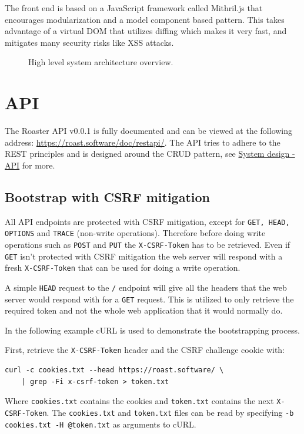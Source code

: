 \documentclass[12pt,a4paper]{report}
\begin{document}
The front end is based on a JavaScript framework called Mithril.js that encourages modularization and a model component based pattern. This takes advantage of a virtual DOM that utilizes diffing which makes it very fast, and mitigates many security risks like XSS attacks. 
\begin{figure}[H]
  \centering
  
  \caption{High level system architecture overview.}
\end{figure}
\chapter{API}
The Roaster API v0.0.1 is fully documented and can be viewed at the following address: \url{https://roast.software/doc/restapi/}. The API tries to adhere to the REST principles and is designed around the CRUD pattern, see \hyperref[sec:api-design]{System design - API} for more.

\section{Bootstrap with CSRF mitigation}
\label{sec:api-bootstrap}
All API endpoints are protected with CSRF mitigation, except for \texttt{GET, HEAD, OPTIONS} and \texttt{TRACE} (non-write operations). Therefore before doing write operations such as \texttt{POST} and \texttt{PUT} the \texttt{X-CSRF-Token} has to be retrieved. Even if \texttt{GET} isn't protected with CSRF mitigation the web server will respond with a fresh \texttt{X-CSRF-Token} that can be used for doing a write operation.

A simple \texttt{HEAD} request to the \texttt{/} endpoint will give all the headers that the web server would respond with for a \texttt{GET} request. This is utilized to only retrieve the required token and not the whole web application that it would normally do.

In the following example cURL is used to demonstrate the bootstrapping process.

First, retrieve the \texttt{X-CSRF-Token} header and the CSRF challenge cookie with:
\begin{verbatim}
curl -c cookies.txt --head https://roast.software/ \
    | grep -Fi x-csrf-token > token.txt
\end{verbatim}
Where \texttt{cookies.txt} contains the cookies and \texttt{token.txt} contains the next \texttt{X-CSRF-Token}.
The \texttt{cookies.txt} and \texttt{token.txt} files can be read by specifying \texttt{-b cookies.txt -H @token.txt} as arguments to cURL.
\end{document}
